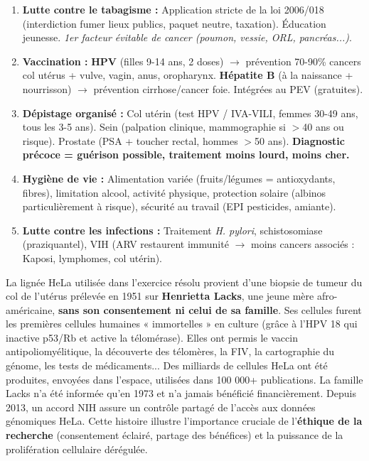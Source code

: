 \documentclass[11pt]{article}
\begin{document}
\begin{aretenir}
\begin{enumerate}
    \item \textbf{Lutte contre le tabagisme :} Application stricte de la loi 2006/018 (interdiction fumer lieux publics, paquet neutre, taxation). Éducation jeunesse. \textit{1er facteur évitable de cancer (poumon, vessie, ORL, pancréas...)}.
    \item \textbf{Vaccination :} \textbf{HPV} (filles 9-14 ans, 2 doses) $\rightarrow$ prévention 70-90\% cancers col utérus + vulve, vagin, anus, oropharynx. \textbf{Hépatite B} (à la naissance + nourrisson) $\rightarrow$ prévention cirrhose/cancer foie. Intégrées au PEV (gratuites).
    \item \textbf{Dépistage organisé :} Col utérin (test HPV / IVA-VILI, femmes 30-49 ans, tous les 3-5 ans). Sein (palpation clinique, mammographie si $>$40 ans ou risque). Prostate (PSA + toucher rectal, hommes $>$50 ans). \textbf{Diagnostic précoce = guérison possible, traitement moins lourd, moins cher.}
    \item \textbf{Hygiène de vie :} Alimentation variée (fruits/légumes = antioxydants, fibres), limitation alcool, activité physique, protection solaire (albinos particulièrement à risque), sécurité au travail (EPI pesticides, amiante).
    \item \textbf{Lutte contre les infections :} Traitement \emph{H. pylori}, schistosomiase (praziquantel), VIH (ARV restaurent immunité $\rightarrow$ moins cancers associés : Kaposi, lymphomes, col utérin).
\end{enumerate}
\end{aretenir}

\begin{savaistu}
La lignée HeLa utilisée dans l'exercice résolu provient d'une biopsie de tumeur du col de l'utérus prélevée en 1951 sur \textbf{Henrietta Lacks}, une jeune mère afro-américaine, \textbf{sans son consentement ni celui de sa famille}. Ses cellules furent les premières cellules humaines « immortelles » en culture (grâce à l'HPV 18 qui inactive p53/Rb et active la télomérase). Elles ont permis le vaccin antipoliomyélitique, la découverte des télomères, la FIV, la cartographie du génome, les tests de médicaments... Des milliards de cellules HeLa ont été produites, envoyées dans l'espace, utilisées dans 100 000+ publications. La famille Lacks n'a été informée qu'en 1973 et n'a jamais bénéficié financièrement. Depuis 2013, un accord NIH assure un contrôle partagé de l'accès aux données génomiques HeLa. Cette histoire illustre l'importance cruciale de l'\textbf{éthique de la recherche} (consentement éclairé, partage des bénéfices) et la puissance de la prolifération cellulaire dérégulée.
\end{savaistu}
\end{document}
